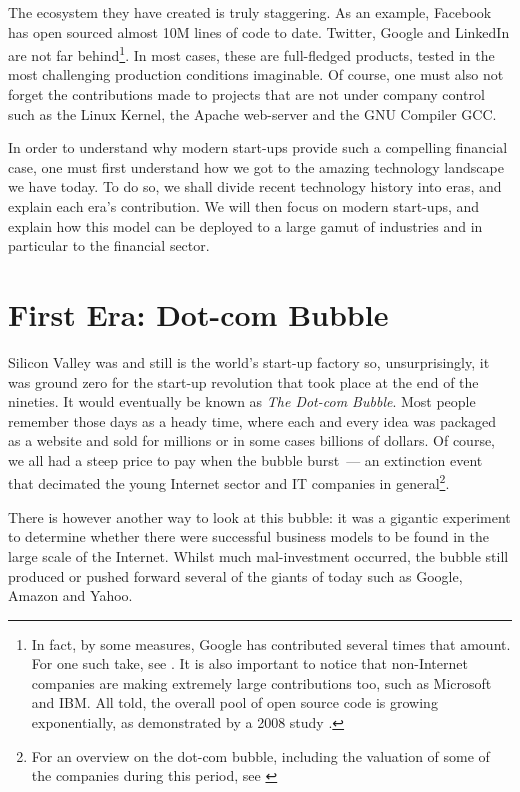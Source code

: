 \documentclass{book}
\begin{document}
The ecosystem they have created is truly staggering. As an example,
Facebook has open sourced almost 10M lines of code to
date\cite{Facebook01}. Twitter, Google and LinkedIn are not far
behind\footnote{In fact, by some measures, Google has contributed
  several times that amount. For one such take, see
  \cite{Orsini01}. It is also important to notice that non-Internet
  companies are making extremely large contributions too, such as
  Microsoft and IBM. All told, the overall pool of open source code is
  growing exponentially, as demonstrated by a 2008 study
  \cite{DeshpandeRiehle01}.}. In most cases, these are full-fledged
products, tested in the most challenging production conditions
imaginable. Of course, one must also not forget the contributions made
to projects that are not under company control such as the Linux
Kernel, the Apache web-server and the GNU Compiler GCC.

In order to understand why modern start-ups provide such a compelling
financial case, one must first understand how we got to the amazing
technology landscape we have today. To do so, we shall divide recent
technology history into eras, and explain each era's contribution. We
will then focus on modern start-ups, and explain how this model can be
deployed to a large gamut of industries and in particular to the
financial sector.

\section{First Era: Dot-com Bubble}

Silicon Valley was and still is the world's start-up factory so,
unsurprisingly, it was ground zero for the start-up revolution that
took place at the end of the nineties. It would eventually be known as
\emph{The Dot-com Bubble}. Most people remember those days as a heady
time, where each and every idea was packaged as a website and sold for
millions or in some cases billions of dollars. Of course, we all had a
steep price to pay when the bubble burst~--- an extinction event that
decimated the young Internet sector and IT companies in
general\footnote{For an overview on the dot-com bubble, including the
  valuation of some of the companies during this period, see
  \cite{Wikipedia01}}.

There is however another way to look at this bubble: it was a gigantic
experiment to determine whether there were successful business models
to be found in the large scale of the Internet. Whilst much
mal-investment occurred, the bubble still produced or pushed forward
several of the giants of today such as Google, Amazon and Yahoo.
\end{document}
